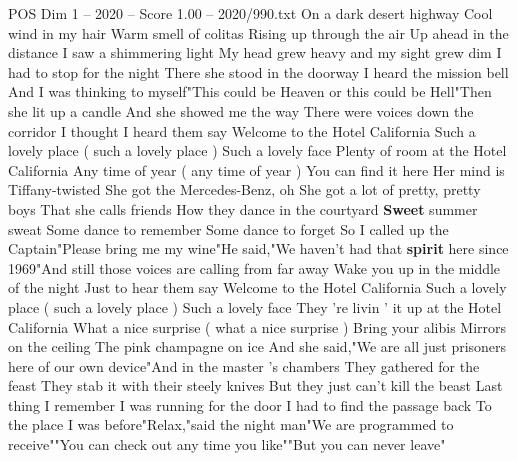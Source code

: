 \begin{textsample}{POS Dim 1 – 2020 – Score 1.00 – 2020/990.txt}  \label{ex:f1_pos_012}
On a dark desert highway Cool wind in my hair Warm smell of colitas Rising up through the air Up ahead in the distance I saw a shimmering light My head grew heavy and my sight grew dim I had to stop for the night There she stood in the doorway I heard the mission bell And I was thinking to myself"This could be Heaven or this could be Hell"Then she lit up a candle And she showed me the way There were voices down the corridor I thought I heard them say Welcome to the Hotel California Such a lovely place ( such a lovely place ) Such a lovely face Plenty of room at the Hotel California Any time of year ( any time of year ) You can find it here Her mind is Tiffany-twisted She got the Mercedes-Benz, oh She got a lot of pretty, pretty boys That she calls friends How they dance in the courtyard \textbf{Sweet} summer sweat Some dance to remember Some dance to forget So I called up the Captain"Please bring me my wine"He said,"We haven't had that \textbf{spirit} here since 1969"And still those voices are calling from far away Wake you up in the middle of the night Just to hear them say Welcome to the Hotel California Such a lovely place ( such a lovely place ) Such a lovely face They 're livin ' it up at the Hotel California What a nice surprise ( what a nice surprise ) Bring your alibis Mirrors on the ceiling The pink champagne on ice And she said,"We are all just prisoners here of our own device"And in the master 's chambers They gathered for the feast They stab it with their steely knives But they just can't kill the beast Last thing I remember I was running for the door I had to find the passage back To the place I was before"Relax,"said the night man"We are programmed to receive""You can check out any time you like""But you can never leave"

\end{textsample}
